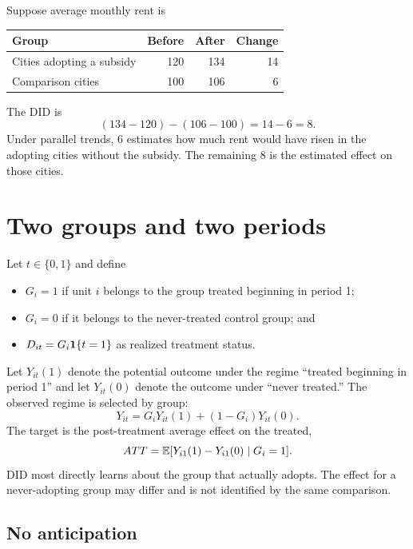\begin{example}
Suppose average monthly rent is
\begin{center}
\begin{tabular}{lrrr}
  \toprule
  Group & Before & After & Change\\
  \midrule
  Cities adopting a subsidy & 120 & 134 & 14\\
  Comparison cities         & 100 & 106 &  6\\
  \bottomrule
\end{tabular}
\end{center}
The DID is
\[
  (134-120)-(106-100)=14-6=8.
\]
Under parallel trends, 6 estimates how much rent would have risen in the
adopting cities without the subsidy.  The remaining 8 is the estimated effect
on those cities.
\end{example}

\section{Two groups and two periods}
\label{sec:did-two-by-two}

Let $t\in\{0,1\}$ and define
\begin{itemize}
  \item $G_i=1$ if unit $i$ belongs to the group treated beginning in period 1;
  \item $G_i=0$ if it belongs to the never-treated control group; and
  \item $D_{it}=G_i\mathbf{1}\{t=1\}$ as realized treatment status.
\end{itemize}
Let $Y_{it}(1)$ denote the potential outcome under the regime ``treated
beginning in period 1'' and let $Y_{it}(0)$ denote the outcome under ``never
treated.''  The observed regime is selected by group:
\begin{equation}
  Y_{it}=G_iY_{it}(1)+(1-G_i)Y_{it}(0).
  \label{eq:did-observed-simple}
\end{equation}
The target is the post-treatment average effect on the treated,
\begin{equation}
  ATT=\mathbb{E}[Y_{i1}(1)-Y_{i1}(0)\mid G_i=1].
  \label{eq:did-att-simple}
\end{equation}
DID most directly learns about the group that actually adopts.  The effect for
a never-adopting group may differ and is not identified by the same comparison.

\subsection{No anticipation}

